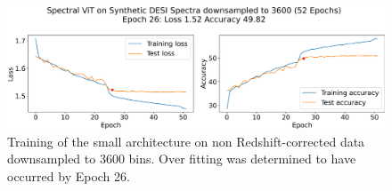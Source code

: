 \begin{figure}
    \centering
    \includegraphics[width=.8\linewidth]{figures/v2_real/vit_model_V2training_new.png}
    \caption{Training of the small architecture on non Redshift-corrected data downsampled to 3600 bins. Over fitting was determined to have occurred by Epoch 26.}
    \label{fig:vit2_training}
\end{figure}

